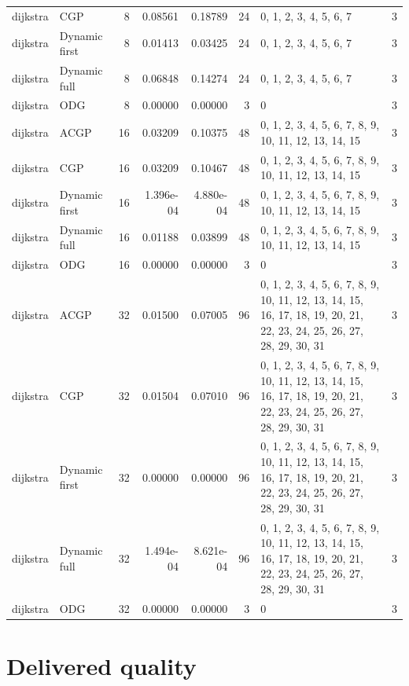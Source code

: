 \documentclass[10pt,a4paper]{article}
\begin{document}
\begin{longtable}{@{}p{23mm}p{29mm}rrrrp{36mm}r@{}}
dijkstra & CGP & 8 & 0.08561 & 0.18789 & 24 & 0, 1, 2, 3, 4, 5, 6, 7 & 3 \\
dijkstra & Dynamic first & 8 & 0.01413 & 0.03425 & 24 & 0, 1, 2, 3, 4, 5, 6, 7 & 3 \\
dijkstra & Dynamic full & 8 & 0.06848 & 0.14274 & 24 & 0, 1, 2, 3, 4, 5, 6, 7 & 3 \\
dijkstra & ODG & 8 & 0.00000 & 0.00000 & 3 & 0 & 3 \\
dijkstra & ACGP & 16 & 0.03209 & 0.10375 & 48 & 0, 1, 2, 3, 4, 5, 6, 7, 8, 9, 10, 11, 12, 13, 14, 15 & 3 \\
dijkstra & CGP & 16 & 0.03209 & 0.10467 & 48 & 0, 1, 2, 3, 4, 5, 6, 7, 8, 9, 10, 11, 12, 13, 14, 15 & 3 \\
dijkstra & Dynamic first & 16 & 1.396e-04 & 4.880e-04 & 48 & 0, 1, 2, 3, 4, 5, 6, 7, 8, 9, 10, 11, 12, 13, 14, 15 & 3 \\
dijkstra & Dynamic full & 16 & 0.01188 & 0.03899 & 48 & 0, 1, 2, 3, 4, 5, 6, 7, 8, 9, 10, 11, 12, 13, 14, 15 & 3 \\
dijkstra & ODG & 16 & 0.00000 & 0.00000 & 3 & 0 & 3 \\
dijkstra & ACGP & 32 & 0.01500 & 0.07005 & 96 & 0, 1, 2, 3, 4, 5, 6, 7, 8, 9, 10, 11, 12, 13, 14, 15, 16, 17, 18, 19, 20, 21, 22, 23, 24, 25, 26, 27, 28, 29, 30, 31 & 3 \\
dijkstra & CGP & 32 & 0.01504 & 0.07010 & 96 & 0, 1, 2, 3, 4, 5, 6, 7, 8, 9, 10, 11, 12, 13, 14, 15, 16, 17, 18, 19, 20, 21, 22, 23, 24, 25, 26, 27, 28, 29, 30, 31 & 3 \\
dijkstra & Dynamic first & 32 & 0.00000 & 0.00000 & 96 & 0, 1, 2, 3, 4, 5, 6, 7, 8, 9, 10, 11, 12, 13, 14, 15, 16, 17, 18, 19, 20, 21, 22, 23, 24, 25, 26, 27, 28, 29, 30, 31 & 3 \\
dijkstra & Dynamic full & 32 & 1.494e-04 & 8.621e-04 & 96 & 0, 1, 2, 3, 4, 5, 6, 7, 8, 9, 10, 11, 12, 13, 14, 15, 16, 17, 18, 19, 20, 21, 22, 23, 24, 25, 26, 27, 28, 29, 30, 31 & 3 \\
dijkstra & ODG & 32 & 0.00000 & 0.00000 & 3 & 0 & 3 \\
\end{longtable}\normalsize\setlength{\tabcolsep}{6pt}
\clearpage
\section*{Delivered quality}
\clearpage
\end{document}
